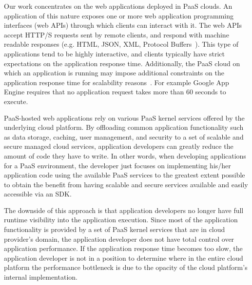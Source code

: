 Our work concentrates on the web
applications deployed in PaaS clouds. An application of this nature exposes
one or more web application programming interfaces (web APIs) through which
clients can interact with it. The web APIs accept HTTP/S requests sent by
remote clients, and respond with machine readable responses (e.g. HTML, JSON,
XML, Protocol Buffers~\cite{XXX}). This type of applications tend to be highly
interactive, and clients typically have strict expectations on the application
response time. 
Additionally, the PaaS cloud on
which an application is running may impose additional constraints on the
application response time for scalability
reasons~\cite{azure-limits,gae-limits}.  For example Google App Engine
requires that no application request takes more than 60 seconds to execute.

PaaS-hosted web applications rely on various PaaS kernel services offered by the underlying
cloud platform. By offloading common application functionality such as data storage, caching,
user management, and security to a set of scalable and secure
managed cloud services, application developers
can greatly reduce the amount of code they have to write. 
In other words, when developing applications for a PaaS environment, the
developer just focuses on implementing his/her application code
using the available PaaS services to the greatest extent possible to obtain
the benefit from having scalable and secure services available and easily
accessible via an SDK.

The downside of this approach is that application developers no longer have full runtime visibility
into the application execution. Since most of the application functionality is provided by a set 
of PaaS kernel services that are in cloud provider's domain, the application
developer does not have total control over application performance. If the application 
response time becomes too slow, the application developer is not in a position to determine
where in the entire cloud platform the performance bottleneck is due to the opacity of the cloud
platform's internal implementation. 

